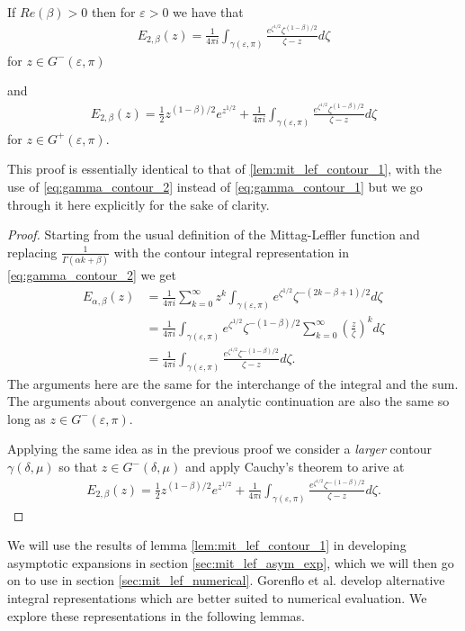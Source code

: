 \begin{lemma}
    If $ Re(\beta) > 0 $ then for $ \varepsilon > 0 $ we have that
    \begin{align}
        E_{2,\beta}(z) = \frac{1}{4\pi i} \int_{\gamma(\varepsilon, \pi)} \frac{e^{\zeta^{1/2}}\zeta^{(1-\beta) / 2}}{\zeta - z}d \zeta
    \end{align}
    for $ z \in G^-(\varepsilon, \pi) $ 

and
    \begin{align}
        E_{2,\beta}(z) = \frac{1}{2} z^{(1-\beta)/2} e^{z^{1/2}} + \frac{1}{4\pi i} \int_{\gamma(\varepsilon, \pi)} \frac{e^{\zeta^{1/2}}\zeta^{(1-\beta) / 2}}{\zeta - z}d \zeta
    \end{align}
    for $ z \in G^+(\varepsilon, \pi) $.
\end{lemma}
This proof is essentially identical to that of \ref{lem:mit_lef_contour_1}, with the use of \eqref{eq:gamma_contour_2} instead of \eqref{eq:gamma_contour_1} but we go through it here explicitly for the sake of clarity. 
\begin{proof}
    Starting from the usual definition of the Mittag-Leffler function and replacing $ \frac{1}{\Gamma(\alpha k + \beta)} $ with the
    contour integral representation in \eqref{eq:gamma_contour_2} we get
    \begin{align}
        E_{\alpha, \beta}(z) &= \frac{1}{4\pi i} \sum_{k=0}^\infty z^k \int_{\gamma(\varepsilon, \pi)} e^{\zeta^{1/2}} \zeta^{-(2k-\beta + 1)/2} d\zeta \\
        &= \frac{1}{4 \pi i} \int_{\gamma(\varepsilon, \pi)} e^{\zeta^{1/2}} \zeta^{-(1-\beta)/2} \sum_{k=0}^\infty \left( \frac{z}{\zeta} \right)^k d\zeta \\
        &= \frac{1}{4\pi i} \int_{\gamma(\varepsilon, \pi)} \frac{e^{\zeta^{1/2}} \zeta^{-(1-\beta)/2}}{\zeta - z} d\zeta.
    \end{align}
    The arguments here are the same for the interchange of the integral and the sum. The arguments about convergence an analytic continuation are also the same so long as $ z \in G^-(\varepsilon, \pi) $. 

    Applying the same idea as in the previous proof we consider a \emph{larger} contour $ \gamma(\delta, \mu) $ so that $ z \in G^-(\delta, \mu) $ and apply Cauchy's theorem to arive at
    \begin{align*}
        E_{2,\beta}(z) = \frac{1}{2} z^{(1-\beta)/2} e^{z^{1/2}} +  \frac{1}{4\pi i} \int_{\gamma(\varepsilon, \pi)} \frac{e^{\zeta^{1/2}} \zeta^{-(1-\beta)/2}}{\zeta - z} d\zeta.
    \end{align*}
\end{proof}
We will use the results of lemma \ref{lem:mit_lef_contour_1} in developing asymptotic expansions in section \ref{sec:mit_lef_asym_exp}, which we will then go on to use in section \ref{sec:mit_lef_numerical}. Gorenflo et al. \cite{Gorenflo2002} develop alternative integral representations which are better suited to numerical evaluation. We explore these representations in the following lemmas. 

